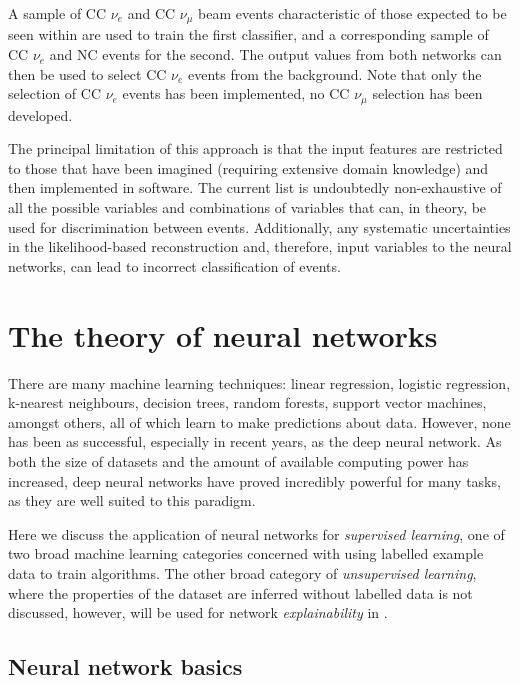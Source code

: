 A sample of CC $\nu_{e}$ and CC $\nu_{\mu}$ beam events characteristic of those expected to be
seen within \chipsfive are used to train the first classifier, and a corresponding sample of CC
$\nu_{e}$ and NC events for the second. The output values from both networks can then be used to
select CC $\nu_{e}$ events from the background. Note that only the selection of CC $\nu_{e}$
events has been implemented, no CC $\nu_{\mu}$ selection has been developed.

The principal limitation of this approach is that the input features are restricted to those that
have been imagined (requiring extensive domain knowledge) and then implemented in software. The
current list is undoubtedly non-exhaustive of all the possible variables and combinations of
variables that can, in theory, be used for discrimination between events. Additionally, any
systematic uncertainties in the likelihood-based reconstruction and, therefore, input variables to
the neural networks, can lead to incorrect classification of events.

\section{The theory of neural networks} %
\label{sec:cnn_theory} %

There are many machine learning techniques: linear regression, logistic regression, k-nearest
neighbours, decision trees, random forests, support vector machines, amongst others, all of which
learn to make predictions about data. However, none has been as successful, especially in recent
years, as the deep neural network. As both the size of datasets and the amount of available
computing power has increased, deep neural networks have proved incredibly powerful for many
tasks, as they are well suited to this paradigm.

Here we discuss the application of neural networks for \emph{supervised learning}, one of two
broad machine learning categories concerned with using labelled example data to train algorithms.
The other broad category of \emph{unsupervised learning}, where the properties of the dataset are
inferred without labelled data is not discussed, however, will be used for network
\emph{explainability} in .

\subsection{Neural network basics} %
\label{sec:cnn_theory_basics} %

